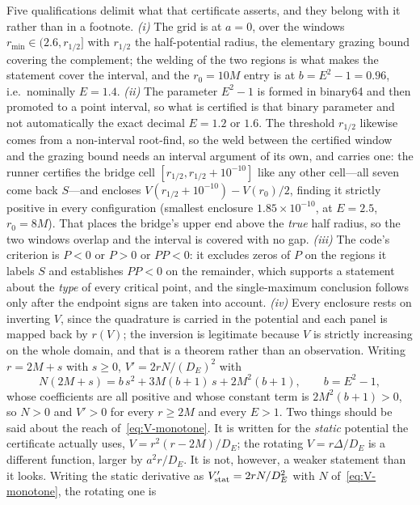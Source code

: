 \documentclass[12pt]{iopart}
\theoremstyle{plain}
\theoremstyle{definition}
\theoremstyle{remark}
\begin{document}
Five qualifications delimit what that certificate asserts, and they belong with
it rather than in a footnote. \emph{(i)} The grid is at $a=0$, over the windows
$r_{\min}\in(2.6,r_{1/2}]$ with $r_{1/2}$ the half-potential radius, the
elementary grazing bound covering the complement; the welding of the two regions
is what makes the statement cover the interval, and the $r_0=10M$ entry is at
$b=E^2-1=0.96$, i.e.\ nominally $E=1.4$. \emph{(ii)} The parameter $E^2-1$ is
formed in binary64 and then promoted to a point interval, so what is certified is
that binary parameter and not automatically the exact decimal $E=1.2$ or $1.6$.
The threshold $r_{1/2}$ likewise comes from a non-interval root-find, so the weld
between the certified window and the grazing bound needs an interval argument of
its own, and carries one: the runner certifies the bridge cell
$[r_{1/2},r_{1/2}+10^{-10}]$ like any other cell---all seven come back $S$---and
encloses $V(r_{1/2}+10^{-10})-V(r_0)/2$, finding it strictly positive in every
configuration (smallest enclosure $1.85\times10^{-10}$, at $E=2.5$, $r_0=8M$).
That places the bridge's upper end above the \emph{true} half radius, so the
two windows overlap and the interval is covered with no gap. \emph{(iii)} The code's criterion is $P<0$ or $P>0$ or $PP<0$:
it excludes zeros of $P$ on the regions it labels $S$ and establishes $PP<0$ on
the remainder, which supports a statement about the \emph{type} of every critical
point, and the single-maximum conclusion follows only after the endpoint signs
are taken into account. \emph{(iv)} Every enclosure rests on inverting $V$, since
the quadrature is carried in the potential and each panel is mapped back by
$r(V)$; the inversion is legitimate because $V$ is strictly increasing on the whole
domain, and that is a theorem rather than an observation. Writing $r=2M+s$ with
$s\ge0$, $V'=2rN/(D_E)^2$ with
\begin{equation}
    N(2M+s)=b\,s^2+3M(b+1)\,s+2M^2(b+1),\qquad b=E^2-1 ,
    \label{eq:V-monotone}
\end{equation}
whose coefficients are all positive and whose constant term is $2M^2(b+1)>0$, so
$N>0$ and $V'>0$ for every $r\ge2M$ and every $E>1$. Two things should be said about
the reach of~\eqref{eq:V-monotone}. It is written for the \emph{static} potential
the certificate actually uses, $V=r^2(r-2M)/D_E$; the rotating $V=r\Delta/D_E$ is a
different function, larger by $a^2r/D_E$. It is not, however, a weaker statement
than it looks. Writing the static derivative as $V'_{\rm stat}=2rN/D_E^2$ with $N$
of~\eqref{eq:V-monotone}, the rotating one is
\end{document}
